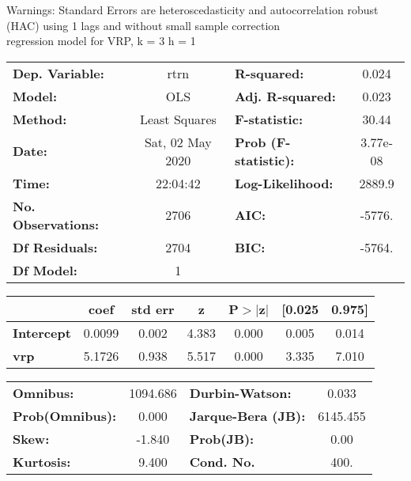 Warnings: \newline
 [1] Standard Errors are heteroscedasticity and autocorrelation robust (HAC) using 1 lags and without small sample correction\\ 

regression model for VRP, k = 3 h = 1\begin{center}
\begin{tabular}{lclc}
\toprule
\textbf{Dep. Variable:}    &       rtrn       & \textbf{  R-squared:         } &     0.024   \\
\textbf{Model:}            &       OLS        & \textbf{  Adj. R-squared:    } &     0.023   \\
\textbf{Method:}           &  Least Squares   & \textbf{  F-statistic:       } &     30.44   \\
\textbf{Date:}             & Sat, 02 May 2020 & \textbf{  Prob (F-statistic):} &  3.77e-08   \\
\textbf{Time:}             &     22:04:42     & \textbf{  Log-Likelihood:    } &    2889.9   \\
\textbf{No. Observations:} &        2706      & \textbf{  AIC:               } &    -5776.   \\
\textbf{Df Residuals:}     &        2704      & \textbf{  BIC:               } &    -5764.   \\
\textbf{Df Model:}         &           1      & \textbf{                     } &             \\
\bottomrule
\end{tabular}
\begin{tabular}{lcccccc}
                   & \textbf{coef} & \textbf{std err} & \textbf{z} & \textbf{P$> |$z$|$} & \textbf{[0.025} & \textbf{0.975]}  \\
\midrule
\textbf{Intercept} &       0.0099  &        0.002     &     4.383  &         0.000        &        0.005    &        0.014     \\
\textbf{vrp}       &       5.1726  &        0.938     &     5.517  &         0.000        &        3.335    &        7.010     \\
\bottomrule
\end{tabular}
\begin{tabular}{lclc}
\textbf{Omnibus:}       & 1094.686 & \textbf{  Durbin-Watson:     } &    0.033  \\
\textbf{Prob(Omnibus):} &   0.000  & \textbf{  Jarque-Bera (JB):  } & 6145.455  \\
\textbf{Skew:}          &  -1.840  & \textbf{  Prob(JB):          } &     0.00  \\
\textbf{Kurtosis:}      &   9.400  & \textbf{  Cond. No.          } &     400.  \\
\bottomrule
\end{tabular}
\end{center}

